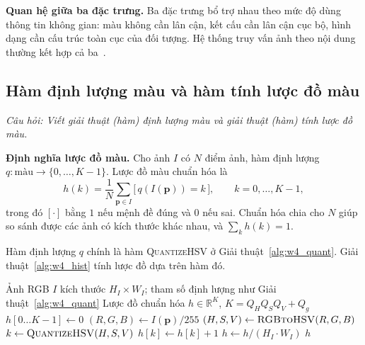\textbf{Quan hệ giữa ba đặc trưng.} Ba đặc trưng bổ trợ nhau theo mức độ dùng thông tin không gian: màu không cần lân cận, kết cấu cần lân cận cục bộ, hình dạng cần cấu trúc toàn cục của đối tượng. Hệ thống truy vấn ảnh theo nội dung thường kết hợp cả ba~\citep{smeulders2000content}.

\subsection{Hàm định lượng màu và hàm tính lược đồ màu}
\label{subsec:w4_functions}

\textit{Câu hỏi: Viết giải thuật (hàm) định lượng màu và giải thuật (hàm) tính lược đồ màu.}

\textbf{Định nghĩa lược đồ màu.} Cho ảnh $I$ có $N$ điểm ảnh, hàm định lượng $q: \text{màu} \rightarrow \{0, \ldots, K - 1\}$. Lược đồ màu chuẩn hóa là
\begin{equation}
h(k) = \frac{1}{N} \sum_{\mathbf{p} \in I} \big[\, q(I(\mathbf{p})) = k \,\big], \qquad k = 0, \ldots, K - 1,
\label{eq:w4_ch}
\end{equation}
trong đó $[\cdot]$ bằng $1$ nếu mệnh đề đúng và $0$ nếu sai. Chuẩn hóa chia cho $N$ giúp so sánh được các ảnh có kích thước khác nhau, và $\sum_k h(k) = 1$.

Hàm định lượng $q$ chính là hàm \textsc{QuantizeHSV} ở Giải thuật~\ref{alg:w4_quant}. Giải thuật~\ref{alg:w4_hist} tính lược đồ dựa trên hàm đó.

\begin{algorithm}[ht]
\caption{Tính lược đồ màu HSV của một ảnh}
\label{alg:w4_hist}
\begin{algorithmic}[1]
\Require Ảnh RGB $I$ kích thước $H_I \times W_I$; tham số định lượng như Giải thuật~\ref{alg:w4_quant}
\Ensure Lược đồ chuẩn hóa $h \in \mathbb{R}^K$, $K = Q_H Q_S Q_V + Q_g$
    \State $h[0 \ldots K-1] \gets 0$
        \State $(R, G, B) \gets I(\mathbf{p}) / 255$
        \State $(H, S, V) \gets \textsc{RGBtoHSV}(R, G, B)$ 
        \State $k \gets \textsc{QuantizeHSV}(H, S, V)$ 
        \State $h[k] \gets h[k] + 1$
    \EndFor
    \State $h \gets h / (H_I \cdot W_I)$ 
    \State \Return $h$
\EndFunction
\end{algorithmic}
\end{algorithm}

